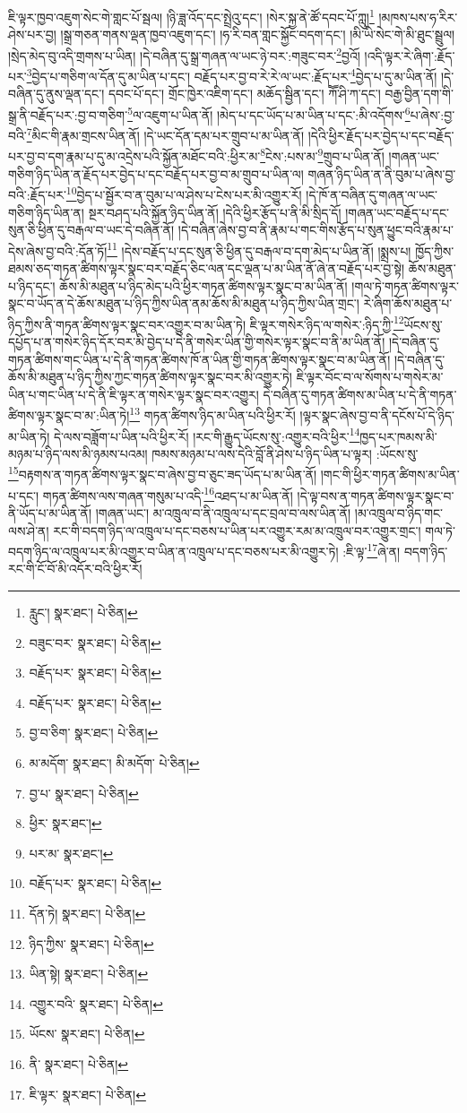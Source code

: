 ཇི་ལྟར་ཁྱབ་འཇུག་སེང་གེ་གླང་པོ་སྦལ། །ཉི་ཟླ་འོད་དང་སྤྲེའུ་དང་། །སེར་སྐྱ་ནེ་ཚོ་དབང་པོ་ཀླུ།\footnote{རླུང་།  སྣར་ཐང་།  པེ་ཅིན། } །མཁས་པས་ཧ་རིར་ཤེས་པར་བྱ། །སྒྲ་གཅན་གནས་ལྡན་ཁྱབ་འཇུག་དང་། །ཧ་རི་བན་གླང་སྐྱོང་བདག་དང་། །མི་ཡི་སེང་གེ་མི་ཐུང་སྦྲུལ། །སྲེད་མེད་བུ་འདི་གྲགས་པ་ཡིན། །དེ་བཞིན་དུ་སྒྲ་གཞན་ལ་ཡང་ཉེ་བར་:གཟུང་བར་\footnote{བཟུང་བར་  སྣར་ཐང་།  པེ་ཅིན། }བྱའོ། །འདི་ལྟར་རེ་ཞིག་:རྗོད་པར་\footnote{བརྗོད་པར་  སྣར་ཐང་།  པེ་ཅིན། }བྱེད་པ་གཅིག་ལ་དོན་དུ་མ་ཡིན་པ་དང་། བརྗོད་པར་བྱ་བ་རེ་རེ་ལ་ཡང་:རྗོད་པར་\footnote{བརྗོད་པར་  སྣར་ཐང་།  པེ་ཅིན། }བྱེད་པ་དུ་མ་ཡིན་ནོ། །དེ་བཞིན་དུ་ནུས་ལྡན་དང་། དབང་པོ་དང་། གྲོང་ཁྱེར་འཇིག་དང་། མཆོད་སྦྱིན་དང་། ཀཽ་ཤི་ཀ་དང་། བརྒྱ་བྱིན་དག་གི་སྒྲ་ནི་བརྗོད་པར་:བྱ་བ་གཅིག་\footnote{བྱ་བ་ཅིག་  སྣར་ཐང་།  པེ་ཅིན། }ལ་འཇུག་པ་ཡིན་ནོ། །མེད་པ་དང་ཡོད་པ་མ་ཡིན་པ་དང་:མི་འདོགས་\footnote{མ་མདོག་  སྣར་ཐང་། མི་མདོག་  པེ་ཅིན། }པ་ཞེས་:བྱ་བའི་\footnote{བྱ་པ་  སྣར་ཐང་།  པེ་ཅིན། }མིང་གི་རྣམ་གྲངས་ཡིན་ནོ། །དེ་ཡང་དོན་དམ་པར་གྲུབ་པ་མ་ཡིན་ནོ། །དེའི་ཕྱིར་རྗོད་པར་བྱེད་པ་དང་བརྗོད་པར་བྱ་བ་དག་རྣམ་པ་དུ་མ་འདྲེས་པའི་སྐྱོན་མཐོང་བའི་:ཕྱིར་མ་\footnote{ཕྱིར་  སྣར་ཐང་། }ངེས་:པས་མ་\footnote{པར་མ་  སྣར་ཐང་། }གྲུབ་པ་ཡིན་ནོ། །གཞན་ཡང་གཅིག་ཉིད་ཡིན་ན་རྗོད་པར་བྱེད་པ་དང་བརྗོད་པར་བྱ་བ་མ་གྲུབ་པ་ཡིན་ལ། གཞན་ཉིད་ཡིན་ན་ནི་བུམ་པ་ཞེས་བྱ་བའི་:རྗོད་པར་\footnote{བརྗོད་པར་  སྣར་ཐང་།  པེ་ཅིན། }བྱེད་པ་སྦྱོར་བ་ན་བུམ་པ་ལ་ཤེས་པ་ངེས་པར་མི་འགྱུར་རོ། །དེ་ཁོ་ན་བཞིན་དུ་གཞན་ལ་ཡང་གཅིག་ཉིད་ཡིན་ན། སྔར་བཤད་པའི་སྐྱོན་ཉིད་ཡིན་ནོ། །དེའི་ཕྱིར་རྩོད་པ་ནི་མི་སྲིད་དོ། །གཞན་ཡང་བརྗོད་པ་དང་སུན་ཅི་ཕྱིན་དུ་བརྒལ་བ་ཡང་དེ་བཞིན་ནོ། །དེ་བཞིན་ཞེས་བྱ་བ་ནི་རྣམ་པ་གང་གིས་རྩོད་པ་སུན་ཕྱུང་བའི་རྣམ་པ་དེས་ཞེས་བྱ་བའི་:དོན་ཏོ།\footnote{དོན་ཏེ།  སྣར་ཐང་།  པེ་ཅིན། } །དེས་བརྗོད་པ་དང་སུན་ཅི་ཕྱིན་དུ་བརྒལ་བ་དག་མེད་པ་ཡིན་ནོ། །སྨྲས་པ། ཁྱོད་ཀྱིས་ཐམས་ཅད་གཏན་ཚིགས་ལྟར་སྣང་བར་བརྗོད་ཅིང་ལན་དང་ལྡན་པ་མ་ཡིན་ནོ་ཞེ་ན་བརྗོད་པར་བྱ་སྟེ། ཆོས་མཐུན་པ་ཉིད་དང་། ཆོས་མི་མཐུན་པ་ཉིད་མེད་པའི་ཕྱིར་གཏན་ཚིགས་ལྟར་སྣང་བ་མ་ཡིན་ནོ། །གལ་ཏེ་གཏན་ཚིགས་ལྟར་སྣང་བ་ཡོད་ན་དེ་ཆོས་མཐུན་པ་ཉིད་ཀྱིས་ཡིན་ནམ་ཆོས་མི་མཐུན་པ་ཉིད་ཀྱིས་ཡིན་གྲང་། རེ་ཞིག་ཆོས་མཐུན་པ་ཉིད་ཀྱིས་ནི་གཏན་ཚིགས་ལྟར་སྣང་བར་འགྱུར་བ་མ་ཡིན་ཏེ། ཇི་ལྟར་གསེར་ཉིད་ལ་གསེར་:ཉིད་ཀྱི་\footnote{ཉིད་ཀྱིས་  སྣར་ཐང་།  པེ་ཅིན། }ཡོངས་སུ་དཔྱོད་པ་ན་གསེར་ཉིད་དོར་བར་མི་བྱེད་པ་དེ་ནི་གསེར་ཡིན་གྱི་གསེར་ལྟར་སྣང་བ་ནི་མ་ཡིན་ནོ། །དེ་བཞིན་དུ་གཏན་ཚིགས་གང་ཡིན་པ་དེ་ནི་གཏན་ཚིགས་ཁོ་ན་ཡིན་གྱི་གཏན་ཚིགས་ལྟར་སྣང་བ་མ་ཡིན་ནོ། །དེ་བཞིན་དུ་ཆོས་མི་མཐུན་པ་ཉིད་ཀྱིས་ཀྱང་གཏན་ཚིགས་ལྟར་སྣང་བར་མི་འགྱུར་ཏེ། ཇི་ལྟར་བོང་བ་ལ་སོགས་པ་གསེར་མ་ཡིན་པ་གང་ཡིན་པ་དེ་ནི་ཇི་ལྟར་ན་གསེར་ལྟར་སྣང་བར་འགྱུར། དེ་བཞིན་དུ་གཏན་ཚིགས་མ་ཡིན་པ་དེ་ནི་གཏན་ཚིགས་ལྟར་སྣང་བ་མ་:ཡིན་ཏེ།\footnote{ཡིན་སྟེ།  སྣར་ཐང་།  པེ་ཅིན། } གཏན་ཚིགས་ཉིད་མ་ཡིན་པའི་ཕྱིར་རོ། །ལྟར་སྣང་ཞེས་བྱ་བ་ནི་དངོས་པོ་དེ་ཉིད་མ་ཡིན་ཏེ། དེ་ལས་བཟློག་པ་ཡིན་པའི་ཕྱིར་རོ། །རང་གི་རྒྱུད་ཡོངས་སུ་:འགྱུར་བའི་ཕྱིར་\footnote{འགྱུར་བའི་  སྣར་ཐང་།  པེ་ཅིན། }ཁྱད་པར་ཁམས་མི་མཉམ་པ་ཉིད་ལས་མི་ཉམས་པའམ། ཁམས་མཉམ་པ་ལས་དེའི་བློ་ནི་ཤེས་པ་ཉིད་ཡིན་པ་ལྟར། :ཡོངས་སུ་\footnote{ཡོངས་  སྣར་ཐང་།  པེ་ཅིན། }བརྟགས་ན་གཏན་ཚིགས་ལྟར་སྣང་བ་ཞེས་བྱ་བ་ཅུང་ཟད་ཡོད་པ་མ་ཡིན་ནོ། །གང་གི་ཕྱིར་གཏན་ཚིགས་མ་ཡིན་པ་དང་། གཏན་ཚིགས་ལས་གཞན་གསུམ་པ་འདི་\footnote{ནི་  སྣར་ཐང་།  པེ་ཅིན། }འཐད་པ་མ་ཡིན་ནོ། །དེ་ལྟ་བས་ན་གཏན་ཚིགས་ལྟར་སྣང་བ་ནི་ཡོད་པ་མ་ཡིན་ནོ། །གཞན་ཡང་། མ་འཁྲུལ་བ་ནི་འཁྲུལ་པ་དང་བྲལ་བ་ལས་ཡིན་ནོ། །མ་འཁྲུལ་བ་ཉིད་གང་ལས་ཤེ་ན། རང་གི་བདག་ཉིད་ལ་འཁྲུལ་པ་དང་བཅས་པ་ཡིན་པར་འགྱུར་རམ་མ་འཁྲུལ་བར་འགྱུར་གྲང་། གལ་ཏེ་བདག་ཉིད་ལ་འཁྲུལ་པར་མི་འགྱུར་བ་ཡིན་ན་འཁྲུལ་པ་དང་བཅས་པར་མི་འགྱུར་ཏེ། :ཇི་ལྟ་\footnote{ཇི་ལྟར་  སྣར་ཐང་།  པེ་ཅིན། }ཞེ་ན། བདག་ཉིད་རང་གི་ངོ་བོ་མི་འདོར་བའི་ཕྱིར་རོ། 